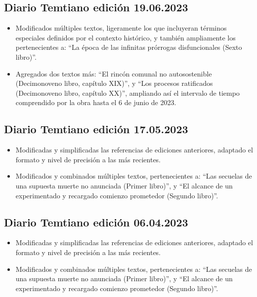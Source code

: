 \documentclass[
]{book}
\begin{document}
\hypertarget{diario-temtiano-ediciuxf3n-19.06.2023}{%
\subsection*{Diario Temtiano edición 19.06.2023}\label{diario-temtiano-ediciuxf3n-19.06.2023}}

\begin{itemize}
\item
  Modificados múltiples textos, ligeramente los que incluyeran términos especiales definidos por el contexto histórico, y también ampliamente los pertenecientes a: ``La época de las infinitas prórrogas disfuncionales (Sexto libro)''.
\item
  Agregados dos textos más: ``El rincón comunal no autosostenible (Decimonoveno libro, capítulo XIX)'', y ``Los procesos ratificados (Decimonoveno libro, capítulo XX)'', ampliando así el intervalo de tiempo comprendido por la obra hasta el 6 de junio de 2023.
\end{itemize}

\hypertarget{diario-temtiano-ediciuxf3n-17.05.2023}{%
\subsection*{Diario Temtiano edición 17.05.2023}\label{diario-temtiano-ediciuxf3n-17.05.2023}}

\begin{itemize}
\item
  Modificadas y simplificadas las referencias de ediciones anteriores, adaptado el formato y nivel de precisión a las más recientes.
\item
  Modificados y combinados múltiples textos, pertenecientes a: ``Las secuelas de una supuesta muerte no anunciada (Primer libro)'', y ``El alcance de un experimentado y recargado comienzo prometedor (Segundo libro)''.
\end{itemize}

\hypertarget{diario-temtiano-ediciuxf3n-06.04.2023}{%
\subsection*{Diario Temtiano edición 06.04.2023}\label{diario-temtiano-ediciuxf3n-06.04.2023}}

\begin{itemize}
\item
  Modificadas y simplificadas las referencias de ediciones anteriores, adaptado el formato y nivel de precisión a las más recientes.
\item
  Modificados y combinados múltiples textos, pertenecientes a: ``Las secuelas de una supuesta muerte no anunciada (Primer libro)'', y ``El alcance de un experimentado y recargado comienzo prometedor (Segundo libro)''.
\end{itemize}
\end{document}
